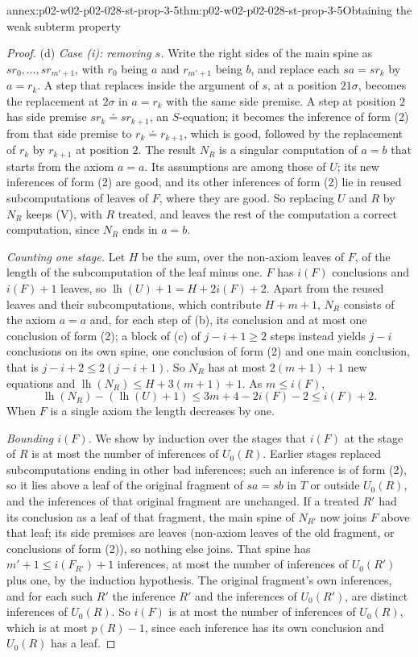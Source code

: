 \begin{annexitem}{annex:p02-w02-p02-028-st-prop-3-5}{thm:p02-w02-p02-028-st-prop-3-5}{Obtaining the weak subterm property}
\begin{proof}
(d) \emph{Case (i): removing \(s\).}  Write the right sides of the main spine
as \(sr_0,\ldots,sr_{m'+1}\), with \(r_0\) being \(a\) and \(r_{m'+1}\) being
\(b\), and replace each \(sa=sr_k\) by \(a=r_k\).  A step that replaces inside
the argument of \(s\), at a position \(21\sigma\), becomes the replacement
at \(2\sigma\) in \(a=r_k\) with the same side premise.  A step at position
\(2\) has side premise \(sr_k\doteq sr_{k+1}\), an \(S\)-equation; it becomes
the inference of form (2) from that side premise to \(r_k\doteq r_{k+1}\),
which is good, followed by the replacement of \(r_k\) by \(r_{k+1}\) at
position \(2\).  The result \(N_R\) is a singular computation of \(a=b\) that
starts from the axiom \(a=a\).  Its assumptions are among those of \(U\); its
new inferences of form (2) are good, and its other inferences of form (2) lie
in reused subcomputations of leaves of \(F\), where they are good.  So
replacing \(U\) and \(R\) by \(N_R\) keeps (V), with \(R\) treated, and leaves
the rest of the computation a correct computation, since \(N_R\) ends in
\(a=b\).

\emph{Counting one stage.}  Let \(H\) be the sum, over the non-axiom leaves
of \(F\), of the length of the subcomputation of the leaf minus one.  \(F\)
has \(i(F)\) conclusions and \(i(F)+1\) leaves, so
\(\operatorname{lh}(U)+1=H+2i(F)+2\).  Apart from the reused leaves and their
subcomputations, which contribute \(H+m+1\), \(N_R\) consists of the axiom
\(a=a\) and, for each step of (b), its conclusion and at most one conclusion
of form (2); a block of (c) of \(j-i+1\geq2\) steps instead yields \(j-i\)
conclusions on its own spine, one conclusion of form (2) and one main
conclusion, that is \(j-i+2\leq2(j-i+1)\).  So \(N_R\) has at most
\(2(m+1)+1\) new equations and
\(\operatorname{lh}(N_R)\leq H+3(m+1)+1\).  As \(m\leq i(F)\),
\[
 \operatorname{lh}(N_R)-(\operatorname{lh}(U)+1)\leq3m+4-2i(F)-2\leq i(F)+2 .
\]
When \(F\) is a single axiom the length decreases by one.

\emph{Bounding \(i(F)\).}  We show by induction over the stages that
\(i(F)\) at the stage of \(R\) is at most the number of inferences of
\(U_0(R)\).  Earlier stages replaced subcomputations ending in other bad
inferences; such an inference is of form (2), so it lies above a leaf of the
original fragment of \(sa=sb\) in \(T\) or outside \(U_0(R)\), and the
inferences of that original fragment are unchanged.  If a treated \(R'\) had
its conclusion as a leaf of that fragment, the main spine of \(N_{R'}\) now
joins \(F\) above that leaf; its side premises are leaves (non-axiom leaves
of the old fragment, or conclusions of form (2)), so nothing else joins.  That
spine has \(m'+1\leq i(F_{R'})+1\) inferences, at most the number of
inferences of \(U_0(R')\) plus one, by the induction hypothesis.  The
original fragment's own inferences, and for each such \(R'\) the inference
\(R'\) and the inferences of \(U_0(R')\), are distinct inferences of
\(U_0(R)\).  So \(i(F)\) is at most the number of inferences of \(U_0(R)\),
which is at most \(p(R)-1\), since each inference has its own conclusion and
\(U_0(R)\) has a leaf.


\end{proof}
\end{annexitem}
